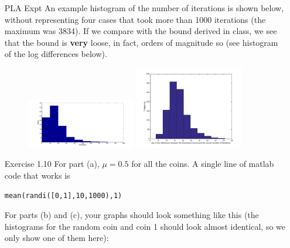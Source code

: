 \documentclass[10pt]{article}
\begin{document}
\begin{enumerate}
\newpage

\item[PLA Expt] An example histogram of the number of iterations
is shown below, without representing four cases that took more than
1000 iterations (the maximum was 3834). If we compare with the bound
derived in class, we see that the bound is \textbf{very} loose, in
fact, orders of magnitude so (see histogram of the log differences
below). 
\begin{figure}[h]
\begin{center}
\includegraphics[width=0.45\textwidth]{perceptron_hist}
\includegraphics[width=0.45\textwidth]{log_hist}
\end{center}
\end{figure}
  

\item[Exercise 1.10] For part (a), $\mu = 0.5$ for all the coins. A
single line of matlab code that works is 
\begin{verbatim}
mean(randi([0,1],10,1000),1)
\end{verbatim}

For parts (b) and (c), your graphs should look something like this
(the histograms for the random coin and coin 1 should look almost
identical, so we only show one of them here):


\end{enumerate}
\end{document}
